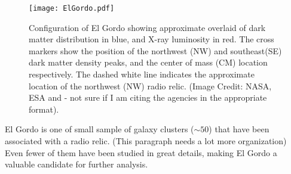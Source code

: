 %
%
\begin{figure}
	\texttt{[image: ElGordo.pdf]}
	\caption{Configuration of El Gordo showing approximate overlaid of dark
		matter distribution in blue, and X-ray luminosity in red. The cross
		markers show the position of the northwest (NW) and southeast(SE) dark
		matter density peaks, and the center of mass (CM) location respectively.   
		The dashed white line indicates the approximate location of the northwest (NW)
		radio relic.
		(Image Credit: NASA, ESA and \citealt{Jee13} - not sure if I am citing
		the agencies in the appropriate format). 
		\label{fig:config}}
\end{figure}
El Gordo is one of small sample of galaxy clusters ($\sim 50$) that have
been associated with a radio relic. (This paragraph needs a lot more
organization) Even fewer of them have been studied in
great details, making El Gordo a valuable candidate for further analysis. 
%
%
